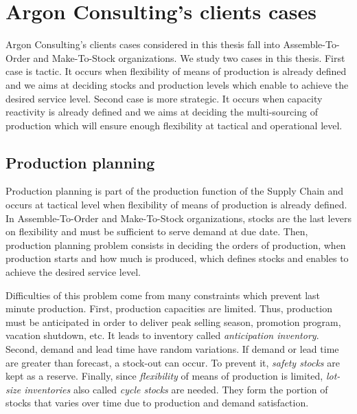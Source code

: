 \section{Argon Consulting's clients cases}


Argon Consulting's clients cases considered in this thesis fall into Assemble-To-Order and Make-To-Stock organizations.
We study two cases in this thesis.
First case is tactic.
It occurs when flexibility of means of production is already defined and we aims at deciding stocks and production levels which enable to achieve the desired service level.
Second case is more strategic.
It occurs when capacity reactivity is already defined and we aims at deciding the multi-sourcing of production which will ensure enough flexibility at tactical and operational level.


\subsection{Production planning}
\label{sec:business-context:argon:pdp}


Production planning is part of the production function of the Supply Chain and occurs at tactical level when flexibility of means of production is already defined.
In Assemble-To-Order and Make-To-Stock organizations, stocks are the last levers on flexibility and must be sufficient to serve demand at due date.
Then, production planning problem consists in deciding the orders of production, \ie when production starts and how much is produced, which defines stocks and enables to achieve the desired service level.


Difficulties of this problem come from many constraints which prevent last minute production.
First, production capacities are limited.
Thus, production must be anticipated in order to deliver peak selling season, promotion program, vacation shutdown, etc.
It leads to inventory called \emph{anticipation inventory}.
Second, demand and lead time have random variations.
If demand or lead time are greater than forecast, a stock-out can occur.
To prevent it, \emph{safety stocks} are kept as a reserve.
Finally, since \emph{flexibility} of means of production is limited, \emph{lot-size inventories} also called \emph{cycle stocks} are needed.
They form the portion of stocks that varies over time due to production and demand satisfaction.


